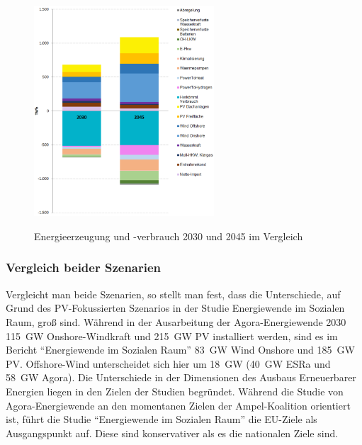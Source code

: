 				\begin{figure}[H]
				\centering
				\includegraphics[page=1, clip, width=0.6\textwidth]{./anhang/Strombilanz Frauenhofer.png}
				\caption{Energieerzeugung und -verbrauch 2030 und 2045 im Vergleich}
				\label{Abb. Energiesystem 2045} \cite{ESRa_Fraunhofer}
			\end{figure}
		
		\subsubsection{Vergleich beider Szenarien}
		Vergleicht man beide Szenarien, so stellt man fest, dass die Unterschiede, auf Grund des  PV-Fokussierten Szenarios in der Studie Energiewende im Sozialen Raum, groß sind. Während in der Ausarbeitung der Agora-Energiewende 2030 \SI{115}{\giga \watt} Onshore-Windkraft und \SI{215}{\giga \watt} PV installiert werden, sind es im Bericht "`Energiewende im Sozialen Raum"' \SI{83}{\giga \watt} Wind Onshore und \SI{185}{\giga \watt} PV. Offshore-Wind unterscheidet sich hier um \SI{18}{\giga \watt} (\SI{40}{\giga \watt} ESRa und \SI{58}{\giga \watt} Agora). Die Unterschiede in der Dimensionen des Ausbaus Erneuerbarer Energien liegen in den Zielen der Studien begründet. Während die Studie von Agora-Energiewende an den momentanen Zielen der Ampel-Koalition orientiert ist, führt die Studie "`Energiewende im Sozialen Raum"' die EU-Ziele als Ausgangspunkt auf. Diese sind konservativer als es die nationalen Ziele sind.\cite{EU_Klimaziele}
		\clearpage
		
		
		